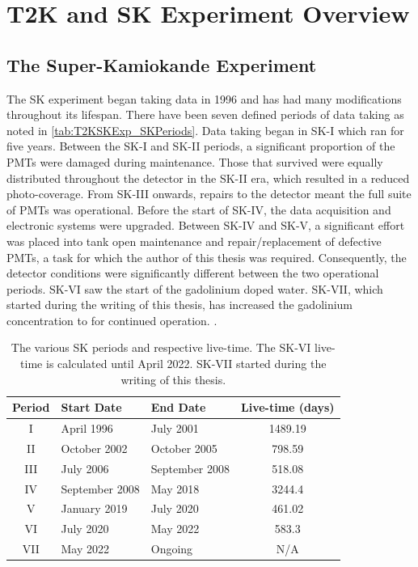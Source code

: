 \chapter{T2K and SK Experiment Overview}
\label{chap:T2KSKExp}

\section{The Super-Kamiokande Experiment}
\label{sec:T2KSKExp_SK}

The SK experiment began taking data in 1996 \cite{Fukuda1998-tw} and has had many modifications throughout its lifespan. There have been seven defined periods of data taking as noted in \autoref{tab:T2KSKExp_SKPeriods}. Data taking began in SK-I which ran for five years. Between the SK-I and SK-II periods, a significant proportion of the PMTs were damaged during maintenance. Those that survived were equally distributed throughout the detector in the SK-II era, which resulted in a reduced photo-coverage. From SK-III onwards, repairs to the detector meant the full suite of PMTs was operational. Before the start of SK-IV, the data acquisition and electronic systems were upgraded. Between SK-IV and SK-V, a significant effort was placed into tank open maintenance and repair/replacement of defective PMTs, a task for which the author of this thesis was required. Consequently, the detector conditions were significantly different between the two operational periods. SK-VI saw the start of the  gadolinium doped water. SK-VII, which started during the writing of this thesis, has increased the gadolinium concentration to  for continued operation. .


\begin{table}[ht!]
    \centering
    \begin{tabular}{c|l|l|c}
      \hline
      Period & Start Date & End Date & Live-time (days) \\
      \hline
      I & April 1996 & July 2001 & 1489.19 \\
      II & October 2002 & October 2005 & 798.59 \\
      III & July 2006 & September 2008 & 518.08 \\
      IV & September 2008 & May 2018 & 3244.4 \\
      V & January 2019 & July 2020 & 461.02 \\
      VI & July 2020 & May 2022 & 583.3 \\
      VII & May 2022 & Ongoing & N/A \\
      \hline 
      \hline
    \end{tabular}
    \caption{The various SK periods and respective live-time. The SK-VI live-time is calculated until  April 2022. SK-VII started during the writing of this thesis.}
    \label{tab:T2KSKExp_SKPeriods}
\end{table}

